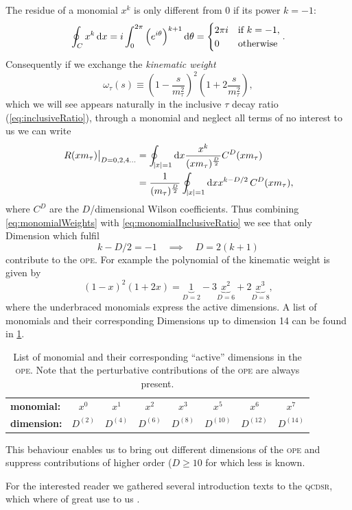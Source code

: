 \documentclass[../../index.tex]{subfiles}
\begin{document}
The residue of a monomial \(x^k\) is only different from 0 if its power
\(k=-1\):
\begin{equation}
  \label{eq:monomialWeights}
  \oint_{C} x^k \dif x = i \int_0^{2\pi}\left(e^{i \theta}\right)^{k+1} \dif \theta
  = \begin{cases} \mbox{$2 \pi i$} & \mbox{if } k=-1, \\ \mbox{0} & \mbox{otherwise} \end{cases}.
\end{equation}
Consequently if we exchange the \textit{kinematic weight}
\begin{equation}
  \label{eq:kinematicWeight}
  \omega_\tau(s) \equiv \left( 1-\frac{s}{m_\tau^2} \right)^2 \left( 1 + 2 \frac{s}{m_\tau^2} \right),
\end{equation}
which we will see appears naturally in the inclusive \(\tau\) decay ratio
(\cref{eq:inclusiveRatio}), through a monomial and neglect all terms of no
interest to us we can write
\begin{equation}
  \label{eq:monomialInclusiveRatio}
  \begin{split}
    \left. R(x m_\tau) \right\rvert_{D=0,2,4\dots} &= \oint_{\abs{x}=1} \dif x \frac{x^k}{(x m_\tau)^{\frac{D}{2}}}C^{D}(x m_\tau) \\
    &= \frac{1}{(m_\tau)^{\frac{D}{2}}} \oint_{\abs{x}=1} \dif x x^{k-D/2}
    \,C^{D}(x m_\tau),
  \end{split}
\end{equation}
where \(C^{D}\) are the \(D\)\-/dimensional Wilson coefficients. Thus combining
\cref{eq:monomialWeights} with \cref{eq:monomialInclusiveRatio} we see that only
Dimension which fulfil
\begin{equation}
  k - D/2 = -1 \quad \implies \quad  D = 2(k+1)
\end{equation}
contribute to the \textsc{ope}. For example the polynomial of the kinematic
weight is given by
\begin{equation}
  (1 - x)^2 (1 + 2x) = \underbrace{1}_{D=2} - 3\underbrace{x^2}_{D=6} + 2\underbrace{x^3}_{D=8},
\end{equation}
where the underbraced monomials express the active dimensions. A list of
monomials and their corresponding Dimensions up to dimension 14 can be found in
\cref{table:monomialDimensions}.
\begin{table}
  \centering
  \begin{tabular}{l|ccccccc}
    \toprule
    \textbf{monomial:} & \(x^0\) & \(x^1\) & \(x^2\) & \(x^3\) & \(x^5\) & \(x^6\) & \(x^7\)\\
    \textbf{dimension:} & \(D^{(2)}\) & \(D^{(4)}\) & \(D^{(6)}\) & \(D^{(8)}\) & \(D^{(10)}\) & \(D^{(12)}\) & \(D^{(14)}\)\\
    \bottomrule 
  \end{tabular}
  \caption{List of monomial and their corresponding ``active'' dimensions in the
    \textsc{ope}. Note that the perturbative contributions of the \textsc{ope}
    are always present.}
  \label{table:monomialDimensions}
\end{table}
This behaviour enables us to bring out different dimensions of the \textsc{ope}
and suppress contributions of higher order (\(D\geq10\) for which less is known.


For the interested reader we gathered several introduction texts to the
\textsc{qcdsr}, which where of great use to us
\cite{Narison1989,Rafael1997,Colangelo2000,Dominguez2013}.
\end{document}
